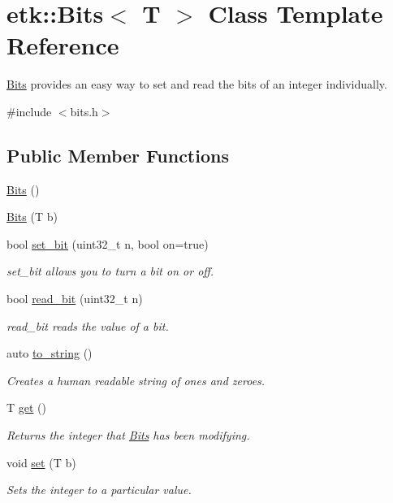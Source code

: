 \hypertarget{classetk_1_1_bits}{\section{etk\-:\-:Bits$<$ T $>$ Class Template Reference}
\label{classetk_1_1_bits}
}


\hyperlink{classetk_1_1_bits}{Bits} provides an easy way to set and read the bits of an integer individually.  




{\ttfamily \#include $<$bits.\-h$>$}

\subsection*{Public Member Functions}
\begin{DoxyCompactItemize}
\item 
\hyperlink{classetk_1_1_bits_a267397258333acde678e061d437e9b36}{Bits} ()
\item 
\hyperlink{classetk_1_1_bits_a0ea9f6cc412e17a55ef34cf2753f7f3e}{Bits} (T b)
\item 
bool \hyperlink{classetk_1_1_bits_af87f87e0e415962c5b701384f7f76320}{set\-\_\-bit} (uint32\-\_\-t n, bool on=true)
\begin{DoxyCompactList}\small\item\em set\-\_\-bit allows you to turn a bit on or off. \end{DoxyCompactList}\item 
bool \hyperlink{classetk_1_1_bits_a1668888b17d42b9ae276923437002a22}{read\-\_\-bit} (uint32\-\_\-t n)
\begin{DoxyCompactList}\small\item\em read\-\_\-bit reads the value of a bit. \end{DoxyCompactList}\item 
auto \hyperlink{classetk_1_1_bits_a692698877d8fa33a6570750979018274}{to\-\_\-string} ()
\begin{DoxyCompactList}\small\item\em Creates a human readable string of ones and zeroes. \end{DoxyCompactList}\item 
T \hyperlink{classetk_1_1_bits_a3d46dbbf64a5e23d1cf7774c3e13c2ea}{get} ()
\begin{DoxyCompactList}\small\item\em Returns the integer that \hyperlink{classetk_1_1_bits}{Bits} has been modifying. \end{DoxyCompactList}\item 
void \hyperlink{classetk_1_1_bits_a8a98aeb0aa064f7c9783148f3c77a9ca}{set} (T b)
\begin{DoxyCompactList}\small\item\em Sets the integer to a particular value. \end{DoxyCompactList}\end{DoxyCompactItemize}


